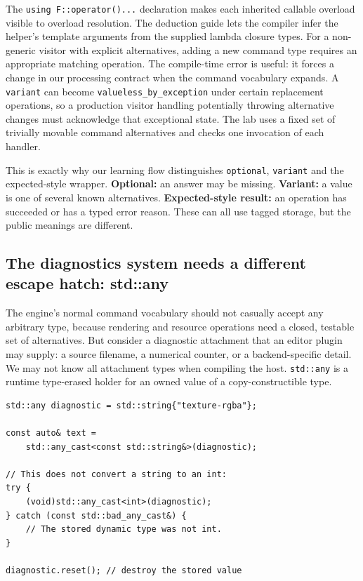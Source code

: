 The \texttt{using\ F::operator()...} declaration makes each inherited callable overload visible to overload resolution. The deduction guide lets the compiler infer the helper's template arguments from the supplied lambda closure types. For a non-generic visitor with explicit alternatives, adding a new command type requires an appropriate matching operation. The compile-time error is useful: it forces a change in our processing contract when the command vocabulary expands. A \texttt{variant} can become \texttt{valueless\_by\_exception} under certain replacement operations, so a production visitor handling potentially throwing alternative changes must acknowledge that exceptional state. The lab uses a fixed set of trivially movable command alternatives and checks one invocation of each handler.

This is exactly why our learning flow distinguishes \texttt{optional}, \texttt{variant} and the expected-style wrapper. \textbf{Optional:} an answer may be missing. \textbf{Variant:} a value is one of several known alternatives. \textbf{Expected-style result:} an operation has succeeded or has a typed error reason. These can all use tagged storage, but the public meanings are different.

\subsection{The diagnostics system needs a different escape hatch: std::any}\label{05-engine-i-ch006-the-diagnostics-system-needs-a-different-escape-hatch-stdany}

The engine's normal command vocabulary should not casually accept any arbitrary type, because rendering and resource operations need a closed, testable set of alternatives. But consider a diagnostic attachment that an editor plugin may supply: a source filename, a numerical counter, or a backend-specific detail. We may not know all attachment types when compiling the host. \texttt{std::any} is a runtime type-erased holder for an owned value of a copy-constructible type.

\begin{verbatim}
std::any diagnostic = std::string{"texture-rgba"};

const auto& text =
    std::any_cast<const std::string&>(diagnostic);

// This does not convert a string to an int:
try {
    (void)std::any_cast<int>(diagnostic);
} catch (const std::bad_any_cast&) {
    // The stored dynamic type was not int.
}

diagnostic.reset(); // destroy the stored value
\end{verbatim}

